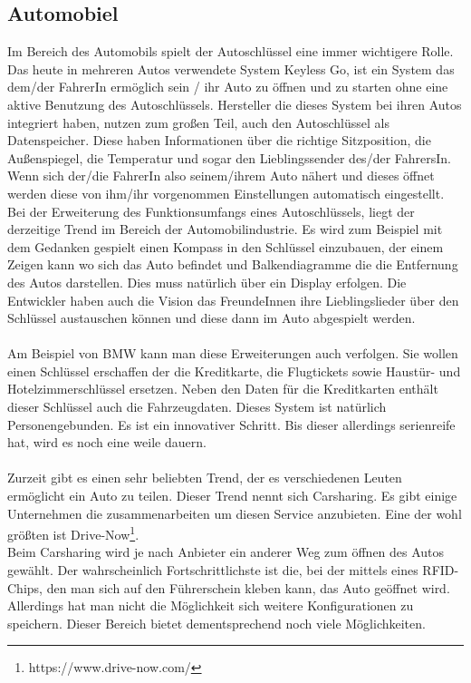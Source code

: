 \subsection{Automobiel} 
Im Bereich des Automobils spielt der Autoschlüssel eine immer wichtigere Rolle. Das heute in mehreren Autos verwendete System Keyless Go, ist ein System das dem/der FahrerIn ermöglich sein / ihr Auto zu öffnen und zu starten ohne eine aktive Benutzung des Autoschlüssels. Hersteller die dieses System bei ihren Autos integriert haben, nutzen zum großen Teil, auch den Autoschlüssel als Datenspeicher. Diese haben Informationen über die richtige Sitzposition, die Außenspiegel, die Temperatur und sogar den Lieblingssender des/der FahrersIn. Wenn sich der/die FahrerIn also seinem/ihrem Auto nähert und dieses öffnet werden diese von ihm/ihr vorgenommen Einstellungen automatisch eingestellt. 
\\
Bei der Erweiterung des Funktionsumfangs eines Autoschlüssels, liegt der derzeitige Trend im Bereich der Automobilindustrie.
Es wird zum Beispiel mit dem Gedanken gespielt einen Kompass in den Schlüssel einzubauen, der einem Zeigen kann wo sich das Auto befindet und Balkendiagramme die die Entfernung des Autos darstellen. Dies muss natürlich über ein Display erfolgen. 
Die Entwickler haben auch die Vision das FreundeInnen ihre Lieblingslieder über den Schlüssel austauschen können und diese dann im Auto abgespielt werden. 
\\\\     
Am Beispiel von BMW kann man diese Erweiterungen auch verfolgen. Sie wollen einen Schlüssel erschaffen der die Kreditkarte, die Flugtickets sowie Haustür- und Hotelzimmerschlüssel ersetzen. 
Neben den Daten für die Kreditkarten enthält dieser Schlüssel auch die Fahrzeugdaten. Dieses System ist natürlich Personengebunden. Es ist ein innovativer Schritt.
Bis dieser allerdings serienreife hat, wird es noch eine weile dauern. 
\\\\
Zurzeit gibt es einen sehr beliebten Trend, der es verschiedenen Leuten ermöglicht ein Auto zu teilen. Dieser Trend nennt sich Carsharing. Es gibt einige Unternehmen die zusammenarbeiten um diesen Service anzubieten. Eine der wohl größten ist Drive-Now\footnote{https://www.drive-now.com/}. 
\\
Beim Carsharing wird je nach Anbieter ein anderer Weg zum öffnen des Autos gewählt. 
Der wahrscheinlich Fortschrittlichste ist die, bei der mittels eines RFID-Chips, den man sich auf den Führerschein kleben kann, das Auto geöffnet wird.  
Allerdings hat man nicht die Möglichkeit sich weitere Konfigurationen zu speichern. Dieser Bereich bietet dementsprechend noch viele Möglichkeiten.


